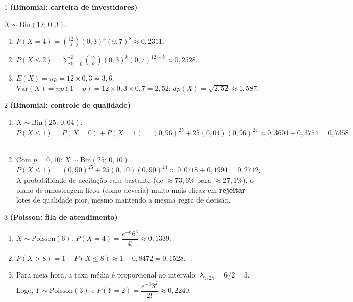 \documentclass[11pt]{article}
\begin{document}

\begin{questao}{1} \textbf{(Binomial: carteira de investidores)}
\begin{solucao}
$X\sim\text{Bin}(12;\,0{,}3)$.
\begin{enumerate}[label=(\alph*)]
  \item $P(X=4) = \binom{12}{4}(0{,}3)^4(0{,}7)^8 \approx 0{,}2311$.
  \item $P(X\le2) = \sum_{k=0}^2 \binom{12}{k}(0{,}3)^k(0{,}7)^{12-k} \approx 0{,}2528$.
  \item $E(X)=np=12\times0{,}3=3{,}6$. $\mathrm{Var}(X)=np(1-p)=12\times0{,}3\times0{,}7=2{,}52$;
    $dp(X)=\sqrt{2{,}52}\approx1{,}587$.
\end{enumerate}
\end{solucao}
\end{questao}

\begin{questao}{2} \textbf{(Binomial: controle de qualidade)}
\begin{solucao}
\begin{enumerate}[label=(\alph*)]
  \item $X\sim\text{Bin}(25;\,0{,}04)$. $P(X\le1) = P(X=0)+P(X=1) = (0{,}96)^{25} +
    25(0{,}04)(0{,}96)^{24} \approx 0{,}3604+0{,}3754 = 0{,}7358$.
  \item Com $p=0{,}10$: $X\sim\text{Bin}(25;\,0{,}10)$. $P(X\le1) = (0{,}90)^{25} +
    25(0{,}10)(0{,}90)^{24} \approx 0{,}0718+0{,}1994=0{,}2712$. A probabilidade de aceitação caiu
    bastante (de $\approx73{,}6\%$ para $\approx27{,}1\%$), o plano de amostragem ficou (como
    deveria) muito mais eficaz em \textbf{rejeitar} lotes de qualidade pior, mesmo mantendo a
    mesma regra de decisão.
\end{enumerate}
\end{solucao}
\end{questao}

\begin{questao}{3} \textbf{(Poisson: fila de atendimento)}
\begin{solucao}
\begin{enumerate}[label=(\alph*)]
  \item $X\sim\text{Poisson}(6)$. $P(X=4) = \dfrac{e^{-6}6^4}{4!} \approx 0{,}1339$.
  \item $P(X>8) = 1-P(X\le8) \approx 1-0{,}8472 = 0{,}1528$.
  \item Para meia hora, a taxa média é proporcional ao intervalo: $\lambda_{1/2h}=6/2=3$. Logo,
    $Y\sim\text{Poisson}(3)$ e $P(Y=2) = \dfrac{e^{-3}3^2}{2!} \approx 0{,}2240$.
\end{enumerate}
\end{solucao}
\end{questao}
\end{document}
